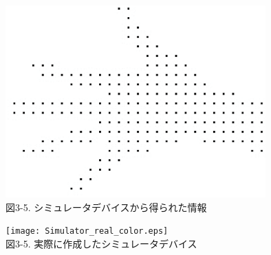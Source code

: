 \begin{center}
  \includegraphics[width=10cm]{Simulator_getInfo.eps} \\

 \vspace{1mm}
  図3-5. シミュレータデバイスから得られた情報
\end{center}

 \vspace{10mm}
\begin{center}
  \texttt{[image: Simulator\_real\_color.eps]} \\

 \vspace{1mm}
  図3-5. 実際に作成したシミュレータデバイス
\end{center}
